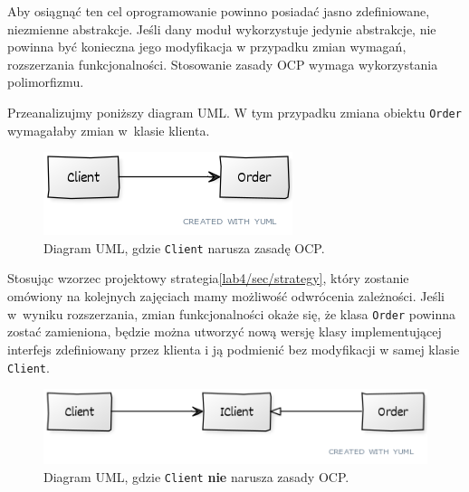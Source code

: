 Aby osiągnąć ten cel oprogramowanie powinno posiadać jasno zdefiniowane, niezmienne abstrakcje. Jeśli dany moduł wykorzystuje jedynie abstrakcje, nie powinna być konieczna jego modyfikacja w przypadku zmian wymagań, rozszerzania funkcjonalności. Stosowanie zasady OCP wymaga wykorzystania polimorfizmu.

Przeanalizujmy poniższy diagram UML. W tym przypadku zmiana obiektu \texttt{Order} wymagałaby zmian w~klasie klienta. 

\begin{figure}[hbt!]
	\centering
	\includegraphics[width=0.6\linewidth]{images/SolidOcpViolationUml}
	\caption{Diagram UML, gdzie \texttt{Client} narusza zasadę OCP.}
	\label{lab1/fig/SolidOcpViolationUml}
\end{figure}

Stosując wzorzec projektowy strategia\ref{lab4/sec/strategy}, który zostanie omówiony na kolejnych zajęciach mamy możliwość odwrócenia zależności. Jeśli w~wyniku rozszerzania, zmian funkcjonalności okaże się, że klasa \texttt{Order} powinna zostać zamieniona, będzie można utworzyć nową wersję klasy implementującej interfejs zdefiniowany przez klienta i ją podmienić bez modyfikacji w samej klasie \texttt{Client}.

\begin{figure}[hbt!]
	\centering
	\includegraphics[width=0.9\linewidth]{images/SolidOcpUml}
	\caption{Diagram UML, gdzie \texttt{Client} \textbf{nie} narusza zasady OCP.}
	\label{lab1/fig/SolidOcpUml}
\end{figure}

